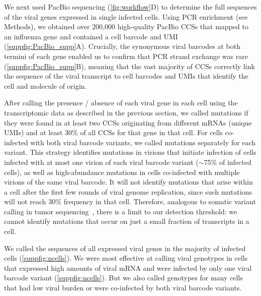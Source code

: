 \documentclass[10pt,letterpaper]{article}
\newcommand{\FIG}[1]{\autoref{fig:#1}}
\newcommand{\SUPPFIG}[1]{\autoref{suppfig:#1}}
\begin{document}
We next used PacBio sequencing (\FIG{workflow}D) to determine the full sequences of the viral genes expressed in single infected cells.
Using PCR enrichment (see Methods), we obtained over 200,000 high-quality PacBio CCSs that mapped to an influenza gene and contained a cell barcode and UMI (\SUPPFIG{PacBio_supp}A).
Crucially, the synonymous viral barcodes at both termini of each gene enabled us to confirm that PCR strand exchange was rare (\SUPPFIG{PacBio_supp}B), meaning that the vast majority of CCSs correctly link the sequence of the viral transcript to cell barcodes and UMIs that identify the cell and molecule of origin.

After calling the presence / absence of each viral gene in each cell using the transcriptomic data as described in the previous section, we called mutations if they were found in at least two CCSs originating from different mRNAs (unique UMIs) and at least 30\% of all CCSs for that gene in that cell.
For cells co-infected with both viral barcode variants, we called mutations separately for each variant.
This strategy identifies mutations in virions that initiate infection of cells infected with at most one virion of each viral barcode variant ($\sim$75\% of infected cells), as well as high-abundance mutations in cells co-infected with multiple virions of the same viral barcode.
It will not identify mutations that arise within a cell after the first few rounds of viral genome replication, since such mutations will not reach 30\% frequency in that cell.
Therefore, analogous to somatic variant calling in tumor sequencing~\citep{xu2014comparison, cibulskis2013sensitive}, there is a limit to our detection threshold: we cannot identify mutations that occur on just a small fraction of transcripts in a cell. 

We called the sequences of all expressed viral genes in the majority of infected cells (\SUPPFIG{ncells}).
We were most effective at calling viral genotypes in cells that expressed high amounts of viral mRNA and were infected by only one viral barcode variant (\SUPPFIG{ncells}).
But we also called genotypes for many cells that had low viral burden or were co-infected by both viral barcode variants.
\end{document}
